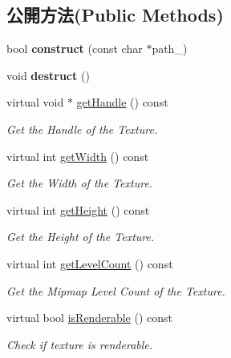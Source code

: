 \subsection*{公開方法(Public Methods)}
\begin{DoxyCompactItemize}
\item 
bool {\bfseries construct} (const char $\ast$path\+\_\+)\hypertarget{class_i_dream_sky_1_1_sprite_sheet_aec334317729f368603b6973fe2093719}{}\label{class_i_dream_sky_1_1_sprite_sheet_aec334317729f368603b6973fe2093719}

\item 
void {\bfseries destruct} ()\hypertarget{class_i_dream_sky_1_1_sprite_sheet_ac902373a404443f8d200dd3c3cc56e7c}{}\label{class_i_dream_sky_1_1_sprite_sheet_ac902373a404443f8d200dd3c3cc56e7c}

\item 
virtual void $\ast$ \hyperlink{class_i_dream_sky_1_1_sprite_sheet_ab6cd54156419571b16fe3f2271c11488}{get\+Handle} () const 
\begin{DoxyCompactList}\small\item\em Get the Handle of the Texture. \end{DoxyCompactList}\item 
virtual int \hyperlink{class_i_dream_sky_1_1_sprite_sheet_aa43930a60edba5b649350d2ad98a9b0c}{get\+Width} () const 
\begin{DoxyCompactList}\small\item\em Get the Width of the Texture. \end{DoxyCompactList}\item 
virtual int \hyperlink{class_i_dream_sky_1_1_sprite_sheet_a72648f274827c0ace93a24f3d9ac62ec}{get\+Height} () const 
\begin{DoxyCompactList}\small\item\em Get the Height of the Texture. \end{DoxyCompactList}\item 
virtual int \hyperlink{class_i_dream_sky_1_1_sprite_sheet_a2205caeee91443f55c464949ba125b68}{get\+Level\+Count} () const 
\begin{DoxyCompactList}\small\item\em Get the Mipmap Level Count of the Texture. \end{DoxyCompactList}\item 
virtual bool \hyperlink{class_i_dream_sky_1_1_sprite_sheet_a21a8d282da4e731ce42adb2dca75c2e1}{is\+Renderable} () const 
\begin{DoxyCompactList}\small\item\em Check if texture is renderable. \end{DoxyCompactList}\item 

\end{DoxyCompactItemize}
